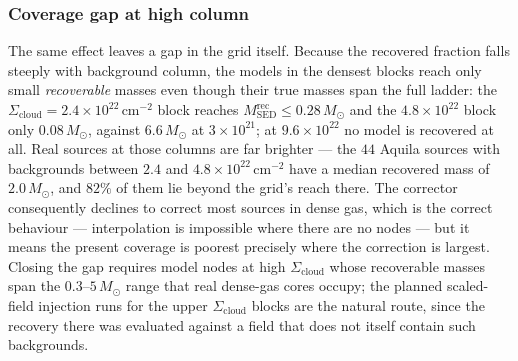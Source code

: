 \documentclass[11pt,a4paper]{article}
\newcommand{\msun}{M_{\odot}}
\newcommand{\Scloud}{\Sigma_{\mathrm{cloud}}}
\begin{document}
\subsubsection*{Coverage gap at high column}
\label{sec:highsigma}


 The same effect leaves a
gap in the grid itself. Because the recovered fraction falls steeply with
background column, the models in the densest blocks reach only small
\emph{recoverable} masses even though their true masses span the full ladder:
the $\Scloud=2.4\times10^{22}\,\mathrm{cm^{-2}}$ block reaches
$M^{\mathrm{rec}}_{\mathrm{SED}}\le0.28\,\msun$ and the
$4.8\times10^{22}$ block only $0.08\,\msun$, against $6.6\,\msun$ at
$3\times10^{21}$; at $9.6\times10^{22}$ no model is recovered at all. Real
sources at those columns are far brighter --- the $44$ Aquila sources with
backgrounds between $2.4$ and $4.8\times10^{22}\,\mathrm{cm^{-2}}$ have a
median recovered mass of $2.0\,\msun$, and $82\%$ of them lie beyond the
grid's reach there. The corrector consequently declines to correct most
sources in dense gas, which is the correct behaviour --- interpolation is
impossible where there are no nodes --- but it means the present coverage is
poorest precisely where the correction is largest. Closing the gap requires
model nodes at high $\Scloud$ whose recoverable masses span the
$0.3$--$5\,\msun$ range that real dense-gas cores occupy; the planned
scaled-field injection runs for the upper $\Scloud$ blocks are the natural
route, since the recovery there was evaluated against a field that does not
itself contain such backgrounds.
\end{document}
